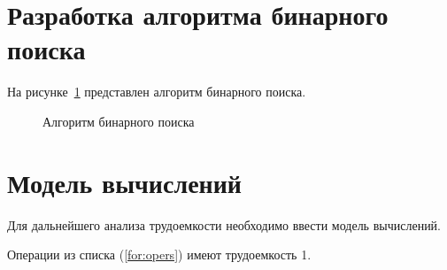 \clearpage

\section{Разработка алгоритма бинарного поиска}

На рисунке~\ref{fig:binary} представлен алгоритм бинарного поиска.

\begin{figure}[h!]
	\caption{Алгоритм бинарного поиска}
	\label{fig:binary}
\end{figure}

\section{Модель вычислений}

Для дальнейшего анализа трудоемкости необходимо ввести модель вычислений.

Операции из списка (\ref{for:opers}) имеют трудоемкость 1.

